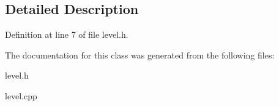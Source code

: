 \subsection{Detailed Description}


Definition at line 7 of file level.\+h.



The documentation for this class was generated from the following files\+:\begin{DoxyCompactItemize}
\item 
level.\+h\item 
level.\+cpp\end{DoxyCompactItemize}
